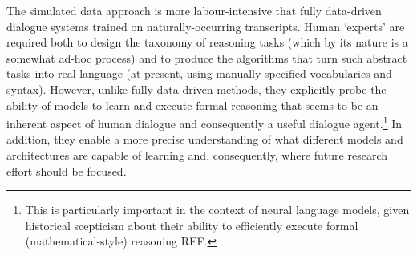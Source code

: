 \documentclass[11pt,letterpaper]{article}
\begin{document}
The simulated data approach is more labour-intensive that fully data-driven dialogue systems trained on naturally-occurring transcripts. Human `experts' are required both to design the taxonomy of reasoning tasks (which by its nature is a somewhat ad-hoc process) and to produce the algorithms that turn such abstract tasks into real language (at present, using manually-specified vocabularies and syntax). However, unlike fully data-driven methods, they explicitly probe the ability of models to learn and execute formal reasoning that seems to be an inherent aspect of human dialogue and consequently a useful dialogue agent.\footnote{This is particularly important in the context of neural language models, given historical scepticism about their ability to efficiently execute formal (mathematical-style) reasoning REF.} In addition, they enable a more precise understanding of what different models and architectures are capable of learning and, consequently, where future research effort should be focused.
\end{document}
